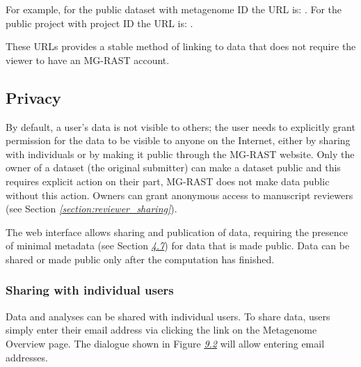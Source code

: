 \documentclass[letterpaper,10pt,english]{sphinxmanual}
\begin{document}


For example, for the public dataset with metagenome ID  the
URL is: . For the
public project with project ID  the URL is:
.

These URLs provides a stable method of linking to data that does not
require the viewer to have an MG-RAST account.


\subsection{Privacy}
\label{\detokenize{faq:privacy}}\label{\detokenize{faq:section-data-visibility}}
By default, a user’s data is not visible to others; the user needs to
explicitly grant permission for the data to be visible to anyone on the
Internet, either by sharing with individuals or by making it public
through the MG-RAST website. Only the owner of a dataset (the original
submitter) can make a dataset public and this requires explicit action
on their part, MG-RAST does not make data public without this action.
Owners can grant anonymous access to manuscript reviewers (see Section
{\hyperref[\detokenize{faq:section:reviewer_sharing}]{\emph{{[}section:reviewer\_sharing{]}}}}).

The web interface allows sharing and publication of data, requiring the
presence of minimal metadata (see Section {\hyperref[\detokenize{faq:section:metadata}]{\emph{4.7}}})
for data that is made public. Data can be shared or made public only
after the computation has finished.


\subsubsection{Sharing with individual users}
\label{\detokenize{faq:sharing-with-individual-users}}\label{\detokenize{faq:section-user-sharing}}
Data and analyses can be shared with individual users. To share data,
users simply enter their email address via clicking the  link
on the Metagenome Overview page. The dialogue shown in Figure
{\hyperref[\detokenize{faq:fig:sharing}]{\emph{9.2}}} will allow entering email addresses.
\end{document}
